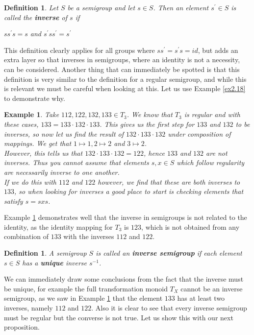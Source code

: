 \documentclass[12pt]{article}
\newtheorem{defn}[theorem]{Definition}
\newtheorem{ex}[theorem]{Example}
\begin{document}
\begin{defn}
	Let $S$ be a semigroup and let $s \in S$. Then an element $s^\prime \in S$ is called the \textbf{inverse} of $s$ if
	\begin{center}
		$ss^\prime s = s$	and	$s^\prime ss^\prime= s^\prime$
	\end{center}
\end{defn}
\noindent This definition clearly applies for all groups where $ss^\prime=s^\prime s=id$, but adds an extra layer so that inverses in semigroups, where an identity is not a necessity, can be considered. Another thing that can immediately be spotted is that this definition is very similar to the definition for a regular semigroup, and while this is relevant we must be careful when looking at this. Let us use Example \ref{ex2.18} to demonstrate why.
\begin{ex}\label{ex3.2}
	Take $112,122,132,133 \in T_3$. We know that $T_3$ is regular and with these cases, $133=133\cdot132\cdot133$. This gives us the first step for $133$ and $132$ to be inverses, so now let us find the result of $132\cdot133\cdot132$ under composition of mappings. We get that $1 \mapsto 1, 2 \mapsto 2$ and $3 \mapsto 2$.\\
	However, this tells us that $132\cdot133\cdot132=122$, hence $133$ and $132$ are not inverses. Thus you cannot assume that elements $s,x \in S$ which follow regularity are necessarily inverse to one another.\\
	If we do this with $112$ and $122$ however, we find that these are both inverses to $133$, so when looking for inverses a good place to start is checking elements that satisfy $s=sxs$.
\end{ex}
Example \ref{ex3.2} demonstrates well that the inverse in semigroups is not related to the identity, as the identity mapping for $T_3$ is $123$, which is not obtained from any combination of $133$ with the inverses $112$ and $122$.\\
\begin{defn}\label{def3.3}
	A semigroup $S$ is called an \textbf{inverse semigroup} if each element $s \in S$ has a \textbf{unique} inverse $s^{-1}$.
\end{defn}
\noindent We can immediately draw some conclusions from the fact that the inverse must be unique, for example the full transformation monoid $T_X$ cannot be an inverse semigroup, as we saw in Example \ref{ex3.2} that the element $133$ has at least two inverses, namely $112$ and $122$. Also it is clear to see that every inverse semigroup must be regular but the converse is not true. Let us show this with our next proposition.
\end{document}
